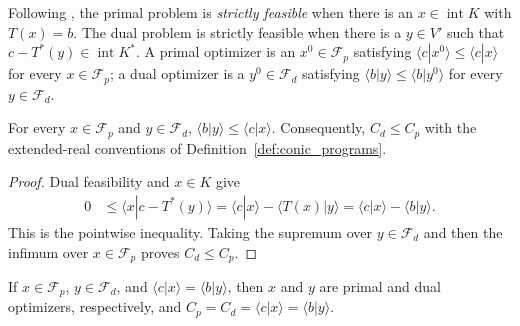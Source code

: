 \begin{definition}
    \label{def:conic_strict_feasibility_and_attainment}
    \leanok
    Following \cite[Chapter~4, lines~72--78]{Wolf2012Quantum}, the primal
    problem is \emph{strictly feasible} when there is an $x\in\operatorname{int}K$
    with $T(x)=b$.  The dual problem is strictly feasible when there is a
    $y\in V'$ such that $c-T^*(y)\in\operatorname{int}K^*$.  A primal
    optimizer is an $x^0\in\mathcal F_p$ satisfying
    $\langle c|x^0\rangle\leq\langle c|x\rangle$ for every
    $x\in\mathcal F_p$; a dual optimizer is a $y^0\in\mathcal F_d$ satisfying
    $\langle b|y\rangle\leq\langle b|y^0\rangle$ for every
    $y\in\mathcal F_d$.
\end{definition}

\begin{theorem}
    \label{thm:conic_weak_duality}
    \leanok
    For every $x\in\mathcal F_p$ and $y\in\mathcal F_d$,
    $\langle b|y\rangle\leq\langle c|x\rangle$.  Consequently,
    $C_d\leq C_p$ with the extended-real conventions of
    Definition~\ref{def:conic_programs}.
\end{theorem}

\begin{proof}
    \leanok
    Dual feasibility and $x\in K$ give
    \begin{align}
        0
         & \leq\langle x|c-T^*(y)\rangle
        =\langle c|x\rangle-\langle T(x)|y\rangle
        =\langle c|x\rangle-\langle b|y\rangle.
        \label{eq:conic_pointwise_weak_duality}
    \end{align}
    This is the pointwise inequality.  Taking the supremum over
    $y\in\mathcal F_d$ and then the infimum over $x\in\mathcal F_p$ proves
    $C_d\leq C_p$.
\end{proof}

\begin{theorem}
    \label{thm:conic_zero_gap_optimizers}
    \leanok
    If $x\in\mathcal F_p$, $y\in\mathcal F_d$, and
    $\langle c|x\rangle=\langle b|y\rangle$, then $x$ and $y$ are primal and
    dual optimizers, respectively, and
    $C_p=C_d=\langle c|x\rangle=\langle b|y\rangle$.
\end{theorem}

